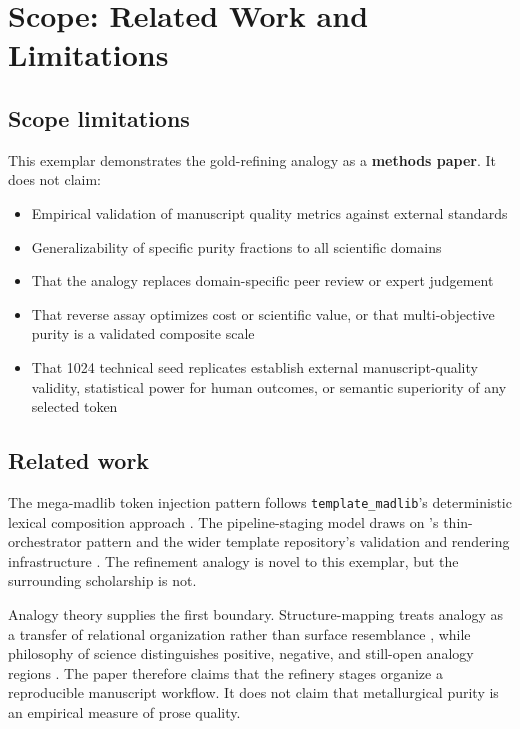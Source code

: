 \documentclass[
  english,
]{article}
\providecommand{\tightlist}{%
  \setlength{\itemsep}{0pt}\setlength{\parskip}{0pt}}
\begin{document}
\newpage

\section{Scope: Related Work and Limitations}\label{sec:scope}

\subsection{Scope limitations}\label{scope-limitations}

This exemplar demonstrates the gold-refining analogy as a
\textbf{methods paper}. It does not claim:

\begin{itemize}
\tightlist
\item
  Empirical validation of manuscript quality metrics against external
  standards
\item
  Generalizability of specific purity fractions to all scientific
  domains
\item
  That the analogy replaces domain-specific peer review or expert
  judgement
\item
  That reverse assay optimizes cost or scientific value, or that
  multi-objective purity is a validated composite scale
\item
  That 1024 technical seed replicates establish external
  manuscript-quality validity, statistical power for human outcomes, or
  semantic superiority of any selected token
\end{itemize}

\subsection{Related work}\label{related-work}

The mega-madlib token injection pattern follows
\texttt{template\_madlib}'s deterministic lexical composition approach
\citep{template_madlib}. The pipeline-staging model draws on
's thin-orchestrator pattern and the
wider template repository's validation and rendering infrastructure
\citep{template_repo}. The refinement analogy is novel to this exemplar,
but the surrounding scholarship is not.

Analogy theory supplies the first boundary. Structure-mapping treats
analogy as a transfer of relational organization rather than surface
resemblance \citep{gentner1983structure}, while philosophy of science
distinguishes positive, negative, and still-open analogy regions
\citep{hesse1966models}. The paper therefore claims that the refinery
stages organize a reproducible manuscript workflow. It does not claim
that metallurgical purity is an empirical measure of prose quality.
\end{document}
